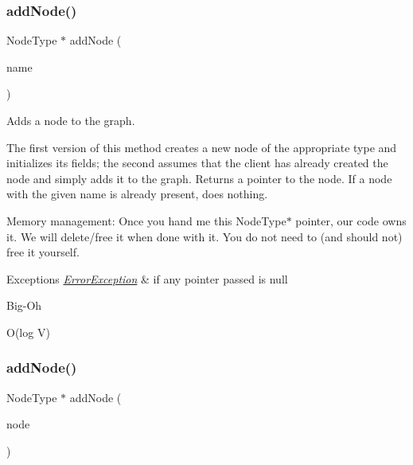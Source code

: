 \subsubsection{\texorpdfstring{add\+Node()}{addNode()}\hspace{0.1cm}{\footnotesize\ttfamily [1/2]}}
{\footnotesize\ttfamily Node\+Type $\ast$ add\+Node (\begin{DoxyParamCaption}\item[{const std\+::string \&}]{name }\end{DoxyParamCaption})}



Adds a node to the graph. 

The first version of this method creates a new node of the appropriate type and initializes its fields; the second assumes that the client has already created the node and simply adds it to the graph. Returns a pointer to the node. If a node with the given name is already present, does nothing.

Memory management\+: Once you hand me this Node\+Type$\ast$ pointer, our code owns it. We will delete/free it when done with it. You do not need to (and should not) free it yourself.


\begin{DoxyExceptions}{Exceptions}
{\em \mbox{\hyperlink{classErrorException}{Error\+Exception}}} & if any pointer passed is null \\
\hline
\end{DoxyExceptions}
\begin{DoxyRefDesc}{Big-\/\+Oh}
\item[\mbox{\hyperlink{BigOh__BigOh000045}{Big-\/\+Oh}}]O(log V) \end{DoxyRefDesc}
\mbox{\label{classGraph_a635fa78d72315816cef6c091acfa3882}} 
\subsubsection{\texorpdfstring{add\+Node()}{addNode()}\hspace{0.1cm}{\footnotesize\ttfamily [2/2]}}
{\footnotesize\ttfamily Node\+Type $\ast$ add\+Node (\begin{DoxyParamCaption}\item[{Node\+Type $\ast$}]{node }\end{DoxyParamCaption})}



